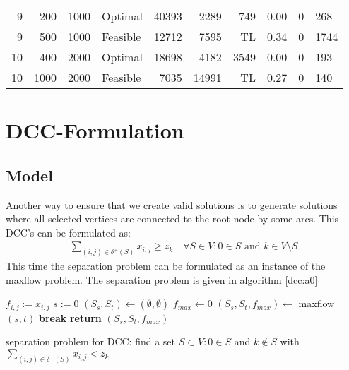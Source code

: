 \documentclass[11pt]{article}
\begin{document}
\begin{tabular}{rrrlrrrrll}
    9 &   200 &       1000 &   Optimal &      40393 &      2289 &           749 &         0.00 &      0 &    268 \\
    9 &   500 &       1000 &  Feasible &      12712 &      7595 &          TL &         0.34 &      0 &   1744 \\
   10 &   400 &       2000 &   Optimal &      18698 &      4182 &          3549 &         0.00 &      0 &    193 \\
   10 &  1000 &       2000 &  Feasible &       7035 &     14991 &          TL &         0.27 &      0 &    140 \\
\bottomrule
\end{tabular}

\section{DCC-Formulation}
\subsection{Model}
Another way to ensure that we create valid solutions is to generate solutions where all selected vertices are connected to the root node by some arcs. This DCC's can be formulated as:
\begin{gather}
	\sum\limits_{(i,j)\in \delta^+(S)} x_{i,j} \geq z_k \quad \forall S \in V:0 \in S \text{ and } k\in V\setminus S \label{dcc:f0}
\end{gather}
This time the separation problem can be formulated as an instance of the maxflow problem. The separation problem is given in algorithm \ref{dcc:a0}

\begin{algorithm}[H]
\DontPrintSemicolon
  $f_{i,j} := x_{i,j}$ 
  $s:=0$ 
  $(S_s, S_t) \leftarrow (\emptyset, \emptyset)$  
  $f_{max} \leftarrow 0$  
  {
  	$(S_s, S_t, f_{max}) \leftarrow$ maxflow$(s,t)$ 
  	{
  	\textbf{break}\;
  	}
  }
  \textbf{return} $(S_s, S_t, f_{max})$\;
\caption{separation problem for DCC: find a set $S\subset V: 0\in S$ and $k\not\in S$ with $\sum\limits_{(i,j)\in\delta^+(S)}x_{i,j}<z_k$}
\label{dcc:a0}
\end{algorithm}
\end{document}
